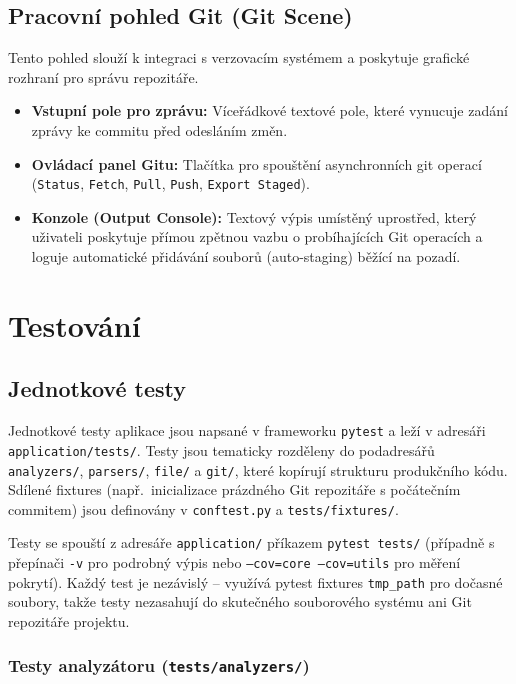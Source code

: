 \documentclass[12pt, a4paper]{article}
\begin{document}
\subsection{Pracovní pohled Git (Git Scene)}
Tento pohled slouží k integraci s verzovacím systémem a poskytuje grafické rozhraní pro správu repozitáře.
\begin{itemize}
    \item \textbf{Vstupní pole pro zprávu:} Víceřádkové textové pole, které vynucuje zadání zprávy ke commitu před odesláním změn.
    \item \textbf{Ovládací panel Gitu:} Tlačítka pro spouštění asynchronních git operací (\texttt{Status}, \texttt{Fetch}, \texttt{Pull}, \texttt{Push}, \texttt{Export Staged}).
    \item \textbf{Konzole (Output Console):} Textový výpis umístěný uprostřed, který uživateli poskytuje přímou zpětnou vazbu o probíhajících Git operacích a loguje automatické přidávání souborů (auto-staging) běžící na pozadí.
\end{itemize}

\section{Testování}

\subsection{Jednotkové testy}

Jednotkové testy aplikace jsou napsané v frameworku \texttt{pytest} a leží v adresáři
\texttt{application/tests/}. Testy jsou tematicky rozděleny do podadresářů
\texttt{analyzers/}, \texttt{parsers/}, \texttt{file/} a \texttt{git/}, které kopírují
strukturu produkčního kódu. Sdílené fixtures (např.\ inicializace prázdného Git repozitáře
s počátečním commitem) jsou definovány v \texttt{conftest.py} a \texttt{tests/fixtures/}.

Testy se spouští z adresáře \texttt{application/} příkazem \texttt{pytest tests/} (případně
s přepínači \texttt{-v} pro podrobný výpis nebo \texttt{--cov=core --cov=utils} pro měření
pokrytí). Každý test je nezávislý -- využívá pytest fixtures \texttt{tmp\_path}
pro dočasné soubory, takže testy nezasahují do skutečného souborového systému ani Git repozitáře
projektu.

\subsubsection*{Testy analyzátoru (\texttt{tests/analyzers/})}
\end{document}

